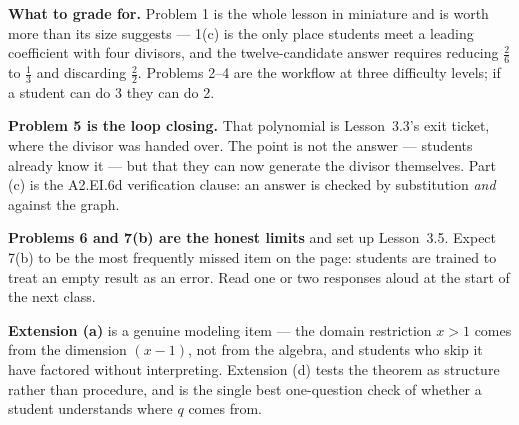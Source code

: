 \documentclass[10pt]{article}
\begin{document}
\begin{teachernote}
\textbf{What to grade for.} Problem 1 is the whole lesson in miniature and is worth more than its
size suggests --- 1(c) is the only place students meet a leading coefficient with four divisors, and
the twelve-candidate answer requires reducing $\tfrac26$ to $\tfrac13$ and discarding $\tfrac22$.
Problems 2--4 are the workflow at three difficulty levels; if a student can do 3 they can do 2.

\vspace{3pt}
\textbf{Problem 5 is the loop closing.} That polynomial is Lesson~3.3's exit ticket, where the
divisor was handed over. The point is not the answer --- students already know it --- but that they
can now generate the divisor themselves. Part (c) is the A2.EI.6d verification clause: an answer is
checked by substitution \emph{and} against the graph.

\vspace{3pt}
\textbf{Problems 6 and 7(b) are the honest limits} and set up Lesson~3.5. Expect 7(b) to be the most
frequently missed item on the page: students are trained to treat an empty result as an error. Read
one or two responses aloud at the start of the next class.

\vspace{3pt}
\textbf{Extension (a)} is a genuine modeling item --- the domain restriction $x>1$ comes from the
dimension $(x-1)$, not from the algebra, and students who skip it have factored without
interpreting. Extension (d) tests the theorem as structure rather than procedure, and is the single
best one-question check of whether a student understands where $q$ comes from.
\end{teachernote}
\end{document}
